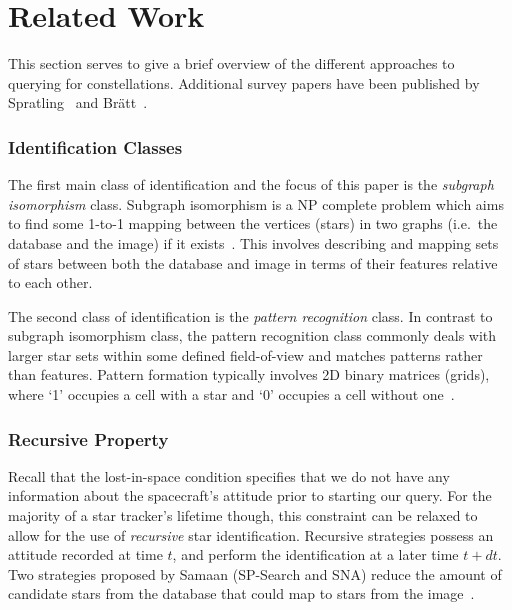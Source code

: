 \newcommand{\nsubparagraph}[1]{\subsubsection{#1}}

\section{Related Work}\label{sec:relatedWork}
This section serves to give a brief overview of the different approaches to querying for constellations.
Additional survey papers have been published by Spratling~\cite{spratling:surveyStarIdentification} and
Br\"{a}tt~\cite{bratt:analysisStarIdentification}.

\nsubparagraph{Identification Classes}
The first main class of identification and the focus of this paper is the \textit{subgraph isomorphism} class.
Subgraph isomorphism is a NP complete problem which aims to find some 1-to-1 mapping between the vertices (stars) in two
graphs (i.e.\ the database and the image) if it exists~\cite{scott:graphIsomorphismProblem}.
This involves describing and mapping sets of stars between both the database and image in terms of their features
relative to each other.

The second class of identification is the \textit{pattern recognition} class.
In contrast to subgraph isomorphism class, the pattern recognition class commonly deals with larger star sets within
some defined field-of-view and matches patterns rather than features.
Pattern formation typically involves 2D binary matrices (grids), where `1' occupies a cell with a star and `0' occupies
a cell without one~\cite{padgett:gridAlgorithm}.

%
%
%

\nsubparagraph{Recursive Property}
Recall that the lost-in-space condition specifies that we do not have any information about the spacecraft's attitude
prior to starting our query.
For the majority of a star tracker's lifetime though, this constraint can be relaxed to allow for the use of
\textit{recursive} star identification.
Recursive strategies possess an attitude recorded at time $t$, and perform the identification at a later time $t + dt$.
Two strategies proposed by Samaan (SP-Search and SNA) reduce the amount of candidate stars from the database that could
map to stars from the image~\cite{samaan:recursiveMode}.

